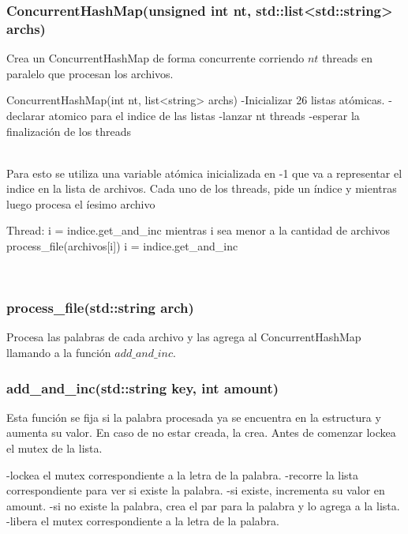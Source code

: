 \subsubsection{ConcurrentHashMap(unsigned int nt, std::list<std::string> archs)}
Crea un ConcurrentHashMap de forma concurrente corriendo $nt$ threads en paralelo que procesan los archivos.\\
\begin{codesnippet}
 ConcurrentHashMap(int nt, list<string> archs)
 	-Inicializar 26 listas atómicas.
 	-declarar atomico para el indice de las listas
 	-lanzar nt threads
 	-esperar la finalización de los threads
\end{codesnippet}\\
Para esto se utiliza una variable atómica inicializada en -1 que va a representar el indice en la lista de archivos.
Cada uno de los threads, pide un índice y mientras luego procesa el íesimo archivo\\
\begin{codesnippet}
 	Thread:
 		i = indice.get_and_inc
 		mientras i sea menor a la cantidad de archivos
 			process_file(archivos[i])
 			i = indice.get_and_inc
\end{codesnippet}\\

\subsubsection{process_file(std::string arch)}
Procesa las palabras de cada archivo y las agrega al ConcurrentHashMap llamando a la función $add\_and\_inc$.

\subsubsection{add_and_inc(std::string key, int amount)}
Esta función se fija si la palabra procesada ya se encuentra en la estructura y aumenta su valor. En caso de no estar creada, la crea. Antes de comenzar lockea el mutex de la lista.\\
\begin{codesnippet}
 	-lockea el mutex correspondiente a la letra de la palabra.
 	-recorre la lista correspondiente para ver si existe la palabra.
 	-si existe, incrementa su valor en amount.
 	-si no existe la palabra, crea el par para la palabra y lo agrega a la lista.
 	-libera el mutex correspondiente a la letra de la palabra.
\end{codesnippet}\\

